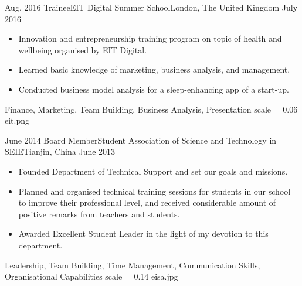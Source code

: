 
\begin{experiences}
	\experience
	{Aug. 2016}	{Trainee}{EIT Digital Summer School}{London, The United Kingdom}
	{July 2016}	{
		\begin{itemize}
			\item Innovation and entrepreneurship training program on topic of health and wellbeing organised by EIT Digital.
			\item Learned basic knowledge of marketing, business analysis, and management.
			\item Conducted business model analysis for a sleep-enhancing app of a start-up.
		\end{itemize}
	}
	{Finance, Marketing, Team Building, Business Analysis, Presentation}
	{scale = 0.06}		{eit.png} 
	\emptySeparator
	
	\experience
	{June 2014}	{Board Member}{Student Association of Science and Technology in  SEIE}{Tianjin, China}
	{June 2013}	{
		\begin{itemize}
			\item Founded Department of Technical Support and set our goals and missions.
			\item Planned and organised technical training sessions for students in our school to improve their professional level, and received considerable amount of positive remarks from teachers and students.
			\item Awarded Excellent Student Leader in the light of my devotion to this department.
		\end{itemize}
	}
	{Leadership, Team Building, Time Management, Communication Skills, Organisational Capabilities}
	{scale = 0.14}		{eisa.jpg} 
\end{experiences}